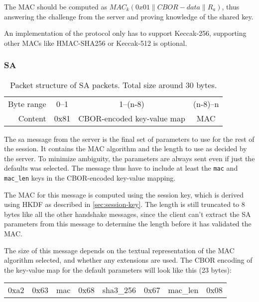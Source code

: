 The MAC should be computed as \( MAC_k(0x01 \| CBOR-data \| R_a) \), thus answering the challenge from the server and proving knowledge of the shared key.

An implementation of the protocol only has to support Keccak-256, supporting other MACs like HMAC-SHA256 or Keccak-512 is optional.


        \subsubsection{SA}

\begin{table}[ht!]
\centering
    \begin{tabular}{r | c | c | c |}
    \cline{2-4}
    Byte range & 0--1 & 1--(n-8) & (n-8)--n \\ \cline{2-4}
    Content & 0x81 & CBOR-encoded key-value map & MAC \\ \cline{2-4}
    \end{tabular}
    \caption{Packet structure of SA packets. Total size around 30 bytes.}
\end{table}

The \gls{sa} message from the server is the final set of parameters to use for the rest of the session. It contains the MAC algorithm and the length to use as decided by the server. To minimize ambiguity, the parameters are always sent even if just the defaults was selected. The message thus have to include at least the \texttt{mac} and \texttt{mac\_len} keys in the CBOR-encoded key-value mapping.

The MAC for this message is computed using the session key, which is derived using HKDF as described in \autoref{sec:session-key}. The length is still truncated to 8 bytes like all the other handshake messages, since the client can't extract the SA parameters from this message to determine the length before it has validated the MAC.

The size of this message depends on the textual representation of the MAC algorithm selected, and whether any extensions are used. The CBOR encoding of the key-value map for the default parameters will look like this (23 bytes):

\begin{table}[ht!]
\centering
    \begin{tabular}{c | c | c | c | c | c | c | c}
    0xa2 & 0x63 & mac & 0x68 & sha3\_256 & 0x67 & mac\_len & 0x08
    \end{tabular}
\end{table}

